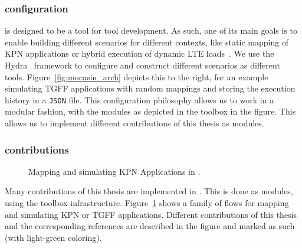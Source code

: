 \subsubsection{configuration}

\mocasin is designed to be a tool for tool development.
As such, one of its main goals is to enable building different scenarios for different contexts, like static mapping of \ac{KPN} applications or hybrid execution of dynamic \ac{LTE} loads~\cite{menard_rapido21}.
We use the Hydra~\cite{yadan2019hydra} framework to configure \mocasin and construct different scenarios as different tools.
Figure~\ref{fig:mocasin_arch} depicts this to the right, for an example simulating \ac{TGFF} applications with random mappings and storing the execution history in a \texttt{JSON} file.
This configuration philosophy allows us to work in a modular fashion, with the modules as depicted in the \mocasin toolbox in the figure.
This allows us to implement different contributions of this thesis as \mocasin modules.

\subsubsection{contributions}

\begin{figure}[h]
	\centering
   \resizebox{0.95\textwidth}{!}{}
	\caption{Mapping and simulating KPN Applications in \mocasin.}
	\label{fig:mocasin_kpn_simulation}
\end{figure}

Many contributions of this thesis are implemented in \mocasin. 
This is done as modules, using the \mocasin toolbox infrastructure. 
Figure~\ref{fig:mocasin_kpn_simulation} shows a family of \mocasin flows for mapping and simulating \ac{KPN} or \ac{TGFF} applications.
Different contributions of this thesis and the corresponding references are described in the figure and marked as such (with light-green coloring).
